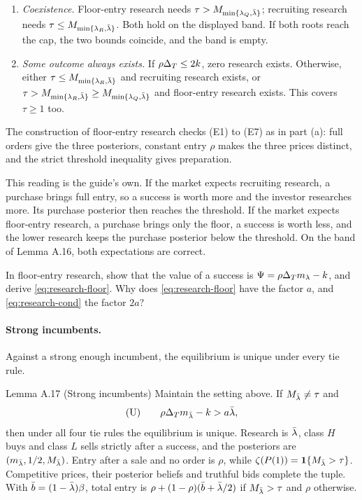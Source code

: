 \begin{enumerate}
\begin{align*}
&=(1-\rho)\,\DT\,m_{\lambda_Q}>0 \why{the \(k\) terms cancel}
\end{align*}
Since \(\mathcal R\) is strictly decreasing with root \(\lambda_R\), \(\lambda_Q<\lambda_R\).
\item \emph{Coexistence.} Floor-entry research needs \(\tau>M_{\min\{\lambda_Q,\bar\lambda\}}\); recruiting research needs
\(\tau\le M_{\min\{\lambda_R,\bar\lambda\}}\). Both hold on the displayed band. If both roots reach the cap, the two bounds
coincide, and the band is empty.
\item \emph{Some outcome always exists.} If \(\rho\Delta_T\le2k\), zero research exists. Otherwise, either
\(\tau\le M_{\min\{\lambda_R,\bar\lambda\}}\) and recruiting research exists, or \(\tau>M_{\min\{\lambda_R,\bar\lambda\}}\ge
M_{\min\{\lambda_Q,\bar\lambda\}}\) and floor-entry research exists. This covers \(\tau\ge1\) too.
\end{enumerate}
The construction of floor-entry research checks (E1) to (E7) as in part (a): full orders give the three posteriors,
constant entry \(\rho\) makes the three prices distinct, and the strict threshold inequality gives preparation.

\begin{intuition}
This reading is the guide's own. If the market expects recruiting research, a purchase brings full entry, so a success
is worth more and the investor researches more. Its purchase posterior then reaches the threshold. If the market
expects floor-entry research, a purchase brings only the floor, a success is worth less, and the lower research keeps
the purchase posterior below the threshold. On the band of Lemma A.16, both expectations are correct.
\end{intuition}

\begin{checkyourself}\label{q:research-floor}
In floor-entry research, show that the value of a success is \(\Psi=\rho\Delta_T m_\lambda-k\), and derive
\eqref{eq:research-floor}. Why does \eqref{eq:research-floor} have the factor \(a\), and \eqref{eq:research-cond} the
factor \(2a\)?
\end{checkyourself}

\paragraph{Strong incumbents.} Against a strong enough incumbent, the equilibrium is unique under every tie rule.

\begin{paperresult}{Lemma A.17 (Strong incumbents)}
Maintain the setting above. If \(M_{\bar\lambda}\ne\tau\) and
\[
\text{(U)}\qquad \rho\Delta_T m_{\bar\lambda}-k>a\bar\lambda ,
\]
then under all four tie rules the equilibrium is unique. Research is \(\bar\lambda\), class \(H\) buys and class \(L\) sells
strictly after a success, and the posteriors are \((m_{\bar\lambda},1/2,M_{\bar\lambda})\). Entry after a sale and no order is \(\rho\),
while \(\zeta(P(1))=\mathbf{1}\{M_{\bar\lambda}>\tau\}\). Competitive prices, their posterior beliefs and truthful bids complete the
tuple. With \(\bar b=(1-\bar\lambda)\beta\), total entry is \(\rho+(1-\rho)(\bar b+\bar\lambda/2)\) if \(M_{\bar\lambda}>\tau\) and \(\rho\)
otherwise.
\end{paperresult}

